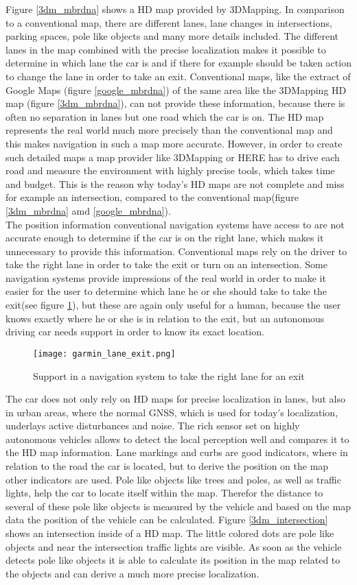 Figure \ref{3dm_mbrdna} shows a HD map provided by 3DMapping. In comparison to a conventional map, there are different lanes, lane changes in intersections, parking spaces, pole like objects and many more details included. The different lanes in the map combined with the precise localization makes it possible to determine in which lane the car is and if there for example should be taken action to change the lane in order to take an exit. Conventional maps, like the extract of Google Maps (figure \ref{google_mbrdna}) of the same area like the 3DMapping HD map (figure \ref{3dm_mbrdna}), can not provide these information, because there is often no separation in lanes but one road which the car is on. The HD map represents the real world much more precisely than the conventional map and this makes navigation in such a map more accurate. However, in order to create such detailed maps a map provider like 3DMapping or HERE has to drive each road and measure the environment with highly precise tools, which takes time and budget. This is the reason why today's HD maps are not complete and miss for example an intersection, compared to the conventional map(figure \ref{3dm_mbrdna} amd \ref{google_mbrdna}).\\
The position information conventional navigation systems have access to are not accurate enough to determine if the car is on the right lane, which makes it unnecessary to provide this information. Conventional maps rely on the driver to take the right lane in order to take the exit or turn on an intersection. Some navigation systems provide impressions of the real world in order to make it easier for the user to determine which lane he or she should take to take the exit(see figure \ref{garmin_navi}), but these are again only useful for a human, because the user knows exactly where he or she is in relation to the exit, but an autonomous driving car needs support in order to know its exact location.
\begin{figure}[!hbt]
\texttt{[image: garmin\_lane\_exit.png]}
\caption{Support in a navigation system to take the right lane for an exit \cite{garmin}}
\label{garmin_navi}
\end{figure}
The car does not only rely on HD maps for precise localization in lanes, but also in urban areas, where the normal \ac{GNSS}, which is used for today's localization, underlays active disturbances and noise.\cite{7795600} The rich sensor set on highly autonomous vehicles allows to detect the local perception well and compares it to the HD map information. Lane markings and curbs are good indicators, where in relation to the road the car is located, but to derive the position on the map other indicators are used. Pole like objects like trees and poles, as well as traffic lights, help the car to locate itself within the map. Therefor the distance to several of these pole like objects is measured by the vehicle and based on the map data the position of the vehicle can be calculated. Figure \ref{3dm_intersection} shows an intersection inside of a HD map. The little colored dots are pole like objects and near the intersection traffic lights are visible. As soon as the vehicle detects pole like objects it is able to calculate its position in the map related to the objects and can derive a much more precise localization.
